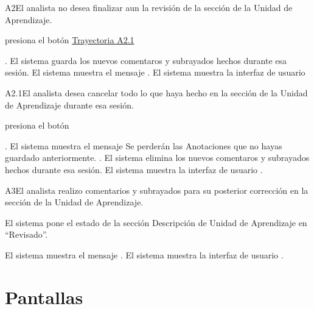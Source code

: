 	
\begin{UCtrayectoriaA}{A2}{El analista no desea finalizar aun la revisión de la sección de la Unidad de Aprendizaje.}

    \hypertarget{SP2-CU7-A2}{\UCpaso[\UCactor] presiona el botón  \hyperlink{SP2-CU7-A2.1}{Trayectoria A2.1}}. 
    \UCpaso El sistema guarda los nuevos comentaros y subrayados hechos durante esa sesión.
    \UCpaso El sistema muestra el mensaje .
    \UCpaso El sistema muestra la interfaz de usuario 
\end{UCtrayectoriaA}

\begin{UCtrayectoriaA}{A2.1}{El analista desea cancelar todo lo que haya hecho en la sección de la Unidad de Aprendizaje durante esa sesión.}

	\hypertarget{SP2-CU7-A2.1}{\UCpaso[\UCactor] presiona el botón }. 
    \UCpaso El sistema muestra el mensaje 
Se perderán las Anotaciones que no hayas guardado anteriormente. .
    \UCpaso El sistema elimina los nuevos comentaros y subrayados hechos durante esa sesión.
    \UCpaso El sistema muestra la interfaz de usuario .
\end{UCtrayectoriaA}

	
\begin{UCtrayectoriaA}{A3}{El analista realizo comentarios y subrayados para su posterior corrección en la sección de la Unidad de Aprendizaje.} 

	\hypertarget{SP2-CU7-A3}{\UCpaso El sistema pone el estado de la sección Descripción de Unidad de Aprendizaje en “Revisado”.}
    \UCpaso El sistema muestra el mensaje .
    \UCpaso El sistema muestra la interfaz de usuario .
\end{UCtrayectoriaA}

\chapter{Pantallas}

